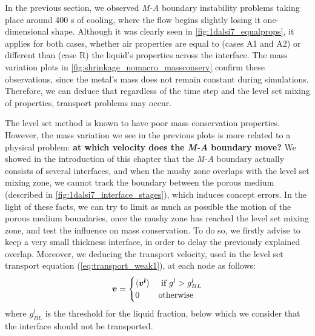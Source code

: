 
In the previous section, we observed \emph{M-A} boundary instability problems taking place around 400 s of cooling, where the flow begins slightly losing it one-dimensional
shape. Although it was clearly seen in \cref{fig:1dalsi7_equalprops}, it applies
for both cases, whether air properties are equal to (cases A1 and A2) or different than (case R) the liquid's properties across the interface. 
The mass variation plots in \cref{fig:shrinkage_nomacro_massconserv} confirm these observations, since the metal's mass does not remain 
constant during simulations.
Therefore, we can deduce that regardless of the time step and the level set mixing of properties, 
transport problems may occur. 

The level set method is known to have poor mass conservation properties. However, the mass variation
we see in the previous plots is more related to a physical problem: \textbf{at which velocity does the \emph{M-A} boundary move?}
We showed in the introduction of this chapter that the \emph{M-A} boundary actually consists of several interfaces, 
and when the mushy zone overlaps with the level set mixing zone, we cannot track the boundary between the porous medium 
(described in \cref{fig:1dalsi7_interface_stages}), which induces concept errors.
In the light of these facts, we can try to limit as much as possible the motion of the porous medium boundaries, once the mushy zone has reached the level set mixing zone,
and test the influence on mass conservation.
To do so, we firstly advise to keep a very small thickness interface, in order to delay the previously explained overlap. Moreover, we deducing the 
transport velocity, used in the level set transport equation (\cref{eq:transport_weak1}), at each node as follows:
\begin{align}
\label{eq:}
\boldsymbol{v} =
\begin{cases}
  \langle \boldsymbol{v^l} \rangle		& \text{ if } g^l > g_{BL}^l \\
  0 		& \text{otherwise}
\end{cases}
\end{align}
where $g_{BL}^l$ is the threshold for the liquid fraction, below which we consider that the interface should not be transported.

